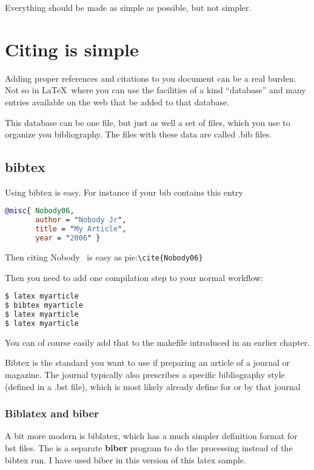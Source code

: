 \begin{savequote}[.4\textwidth]
\sffamily
Everything should be made as simple as possible, but not simpler.
\end{savequote}
\chapter{Citing is simple}

Adding proper references and citations to you document can be a real
burden.
Not so in \LaTeX\ where you can use the facilities of a kind ``database''
and many entries available on the web that be added to that database.

This database can be one file, but just as well a set of files, which
you use to organize you bibliography. The files with these data are
called .bib files. 

\section{bibtex}
Using bibtex is easy.
For instance if your bib contains this entry \citep{bibtexsite}
\begin{lstlisting}[language=BibTeX]
@misc{ Nobody06,
       author = "Nobody Jr",
       title = "My Article",
       year = "2006" }
\end{lstlisting}
\lstset{language=BibTeX}
Then citing Nobody~\cite{Nobody06} is easy as
pie:\lstinline|\cite{Nobody06}|

Then you need to add one compilation step to your normal workflow:

\begin{lstlisting}[language=sh]
$ latex myarticle
$ bibtex myarticle
$ latex myarticle
$ latex myarticle
\end{lstlisting}

You can of course easily add that to the makefile introduced in an
earlier chapter.

Bibtex is the standard you want to use if preparing an article of a
journal or magazine. The journal typically also prescribes a specific
bibliography style (defined in a .bst file), which is most likely
already define for or by that journal

\subsection{Biblatex and biber}
A bit more modern is biblatex, which has a much simpler definition
format for bst files. The is a separate \textbf{biber} program to do
the processing instead of the bibtex run.
I have used biber in this version of this latex sample.